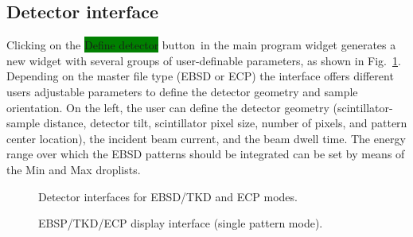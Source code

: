 \documentclass[DIV=calc, paper=letter, fontsize=11pt]{scrartcl}	 %
\newcommand{\button}[1]{\colorbox{green}{\textsf{#1}} button}
\begin{document}
\subsection{Detector interface\label{sec:idldetector}}
Clicking on the \button{Define detector}\ in the main program widget generates a new widget with several groups of user-definable parameters, as
shown in Fig.~\ref{fig:detector}.  Depending on the master file type (EBSD or ECP) the interface offers different users adjustable parameters
to define the detector geometry and sample orientation.
On the left, the user can define the detector geometry (scintillator-sample distance, detector tilt, scintillator pixel size, number of pixels, and pattern
center location), the incident beam current, and the beam dwell time. The energy range 
over which the EBSD patterns should be integrated can be set by means of the Min and Max droplists.  

\begin{figure}[t]
\leavevmode\centering
\epsfxsize=6in
\caption{\label{fig:detector}Detector interfaces for EBSD/TKD and ECP modes.}
\end{figure}

\begin{figure}[t]
\leavevmode\centering
\epsfxsize=5in
\caption{\label{fig:EBSP}EBSP/TKD/ECP display interface (single pattern mode).}
\end{figure}
\end{document}
